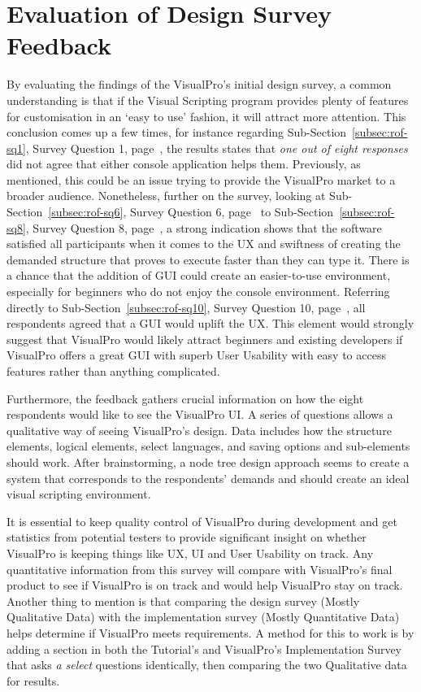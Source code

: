 \documentclass[12pt]{report} %
\begin{document}
		\chapter{Evaluation of Design Survey Feedback}
			By evaluating the findings of the VisualPro's initial design survey, a common understanding is that if the Visual Scripting program provides plenty of features for customisation in an `easy to use' fashion, it will attract more attention. This conclusion comes up a few times, for instance regarding Sub-Section~\ref{subsec:rof-sq1}, Survey Question 1, page~\pageref{subsec:rof-sq1}, the results states that \textit{one out of eight responses} did not agree that either console application helps them. Previously, as mentioned, this could be an issue trying to provide the VisualPro market to a broader audience. Nonetheless, further on the survey, looking at Sub-Section~\ref{subsec:rof-sq6}, Survey Question 6, page~\pageref{subsec:rof-sq6} to Sub-Section~\ref{subsec:rof-sq8}, Survey Question 8, page~\pageref{subsec:rof-sq8}, a strong indication shows that the software satisfied all participants when it comes to the UX and swiftness of creating the demanded structure that proves to execute faster than they can type it. There is a chance that the addition of GUI could create an easier-to-use environment, especially for beginners who do not enjoy the console environment. Referring directly to Sub-Section~\ref{subsec:rof-sq10}, Survey Question 10, page~\pageref{subsec:rof-sq10}, all respondents agreed that a GUI would uplift the UX. This element would strongly suggest that VisualPro would likely attract beginners and existing developers if VisualPro offers a great GUI with superb User Usability with easy to access features rather than anything complicated.

			Furthermore, the feedback gathers crucial information on how the eight respondents would like to see the VisualPro UI. A series of questions allows a qualitative way of seeing VisualPro's design. Data includes how the structure elements, logical elements, select languages, and saving options and sub-elements should work. After brainstorming, a node tree design approach seems to create a system that corresponds to the respondents' demands and should create an ideal visual scripting environment.

			It is essential to keep quality control of VisualPro during development and get statistics from potential testers to provide significant insight on whether VisualPro is keeping things like UX, UI and User Usability on track. Any quantitative information from this survey will compare with VisualPro's final product to see if VisualPro is on track and would help VisualPro stay on track. Another thing to mention is that comparing the design survey (Mostly Qualitative Data) with the implementation survey (Mostly Quantitative Data) helps determine if VisualPro meets requirements. A method for this to work is by adding a section in both the Tutorial's and VisualPro's Implementation Survey that asks \textit{a select} questions identically, then comparing the two Qualitative data for results.
\end{document}
